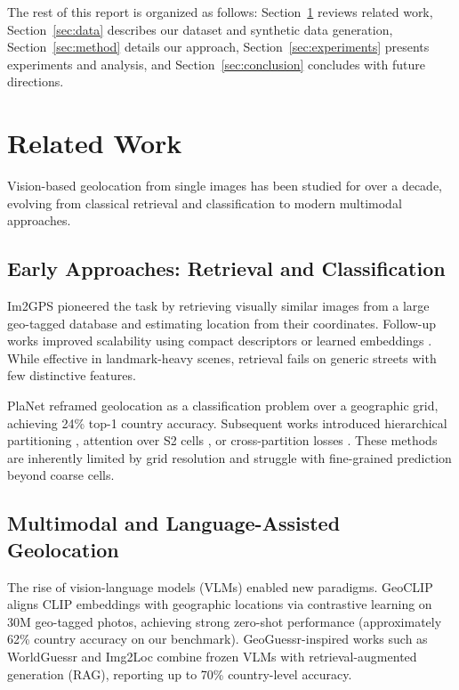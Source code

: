 \documentclass[11pt,a4paper]{article}
\begin{document}
The rest of this report is organized as follows: Section~\ref{sec:related} reviews related work, Section~\ref{sec:data} describes our dataset and synthetic data generation, Section~\ref{sec:method} details our approach, Section~\ref{sec:experiments} presents experiments and analysis, and Section~\ref{sec:conclusion} concludes with future directions.

\section{Related Work}
\label{sec:related}

Vision-based geolocation from single images has been studied for over a decade, evolving from classical retrieval and classification to modern multimodal approaches.

\subsection{Early Approaches: Retrieval and Classification}
Im2GPS \cite{hays2008im2gps} pioneered the task by retrieving visually similar images from a large geo-tagged database and estimating location from their coordinates. Follow-up works improved scalability using compact descriptors \cite{vo2017revisiting} or learned embeddings \cite{shi2022beyond}. While effective in landmark-heavy scenes, retrieval fails on generic streets with few distinctive features.

PlaNet \cite{weyand2016planet} reframed geolocation as a classification problem over a geographic grid, achieving 24\% top-1 country accuracy. Subsequent works introduced hierarchical partitioning \cite{muller2023partitioned}, attention over S2 cells \cite{luo2023geocapsnet}, or cross-partition losses \cite{seo2023cpplanet}. These methods are inherently limited by grid resolution and struggle with fine-grained prediction beyond coarse cells.

\subsection{Multimodal and Language-Assisted Geolocation}
The rise of vision-language models (VLMs) enabled new paradigms. GeoCLIP \cite{ayush2021geoclip} aligns CLIP embeddings with geographic locations via contrastive learning on 30M geo-tagged photos, achieving strong zero-shot performance (approximately 62\% country accuracy on our benchmark). GeoGuessr-inspired works such as WorldGuessr \cite{chen2024worldguessr} and Img2Loc \cite{ma2024img2loc} combine frozen VLMs with retrieval-augmented generation (RAG), reporting up to 70\% country-level accuracy.
\end{document}
